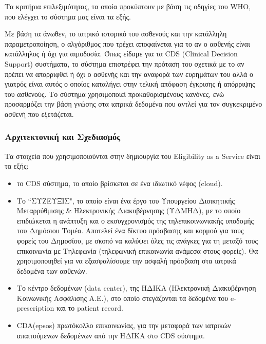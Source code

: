		Τα κριτήρια επιλεξιμότητας, τα οποία προκύπτουν με βάση τις οδηγίες του WHO, \cite{safety} που ελέγχει το σύστημα μας είναι τα εξής.
		
		
		Με βάση τα άνωθεν, το ιατρικό ιστορικό του ασθενούς και την κατάλληλη παραμετροποίηση, ο αλγόριθμος που τρέχει αποφαίνεται για το αν ο ασθενής είναι κατάλληλος ή όχι για αιμοδοσία. Όπως είδαμε για τα CDS (Clinical Decision Support) συστήματα, το σύστημα επιστρέφει την πρόταση του σχετικά με το αν πρέπει να απορριφθεί ή όχι ο ασθενής και την αναφορά των ευρημάτων του αλλά ο γιατρός είναι αυτός ο οποίος καταλήγει στην τελική απόφαση έγκρισης ή απόρριψης του ασθενούς. Το σύστημα χρησιμοποιεί προκαθορισμένους κανόνες, ενώ προσαρμόζει την βάση γνώσης στα ιατρικά δεδομένα που αντλεί για τον συγκεκριμένο ασθενή που εξετάζεται.
	
		
	\subsubsection{Αρχιτεκτονική και Σχεδιασμός}
		
		Τα στοιχεία που χρησιμοποιούνται στην δημιουργία του Eligibility as a Service είναι τα εξής:
		
		\begin{itemize}
		
		\item το CDS σύστημα, το οποίο βρίσκεται σε ένα ιδιωτικό νέφος (cloud).

		\item Το ``ΣΥΖΕΥΞΙΣ", το οποίο είναι ένα έργο του Υπουργείου Διοικητικής Μεταρρύθμισης \& Ηλεκτρονικής Διακυβέρνησης (ΥΔΜΗΔ), με το οποίο επιδιώκεται η ανάπτυξη και ο εκσυγχρονισμός της τηλεπικοινωνιακής υποδομής του Δημόσιου Τομέα. Αποτελεί  ένα δίκτυο πρόσβασης και κορμού για τους φορείς του Δημοσίου, με σκοπό να καλύψει όλες τις ανάγκες για τη μεταξύ τους επικοινωνία με  Τηλεφωνία (τηλεφωνική επικοινωνία ανάμεσα στους φορείς). Θα χρησιμοποιηθεί για να εξασφαλίσουμε την ασφαλή πρόσβαση στα ιατρικά δεδομένα των ασθενών.
		
		\item Το κέντρο δεδομένων (data center), της ΗΔΙΚΑ (Ηλεκτρονική Διακυβέρνηση Κοινωνικής Ασφάλισης Α.Ε.), στο οποίο στεγάζονται τα δεδομένα του e-prescription και το patient record.
		

		\item CDA(epsos) πρωτόκολλο επικοινωνίας, για την μεταφορά των ιατρικών απαιτούμενων δεδομένων από την ΗΔΙΚΑ στο CDS σύστημα.
			
		\end{itemize}				
		
